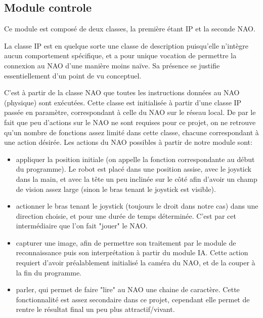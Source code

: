 \subsection{Module controle}
\label{sub:Module controle}
  \par Ce module est composé de deux classes, la première étant IP et la seconde NAO.

  \par La classe IP est en quelque sorte une classe de description puisqu'elle n'intègre aucun comportement spécifique, et a pour unique vocation de permettre la connexion au NAO d'une manière moins naïve.
  Sa présence se justifie essentiellement d'un point de vu conceptuel.

  \par C'est à partir de la classe NAO que toutes les instructions données au NAO (physique) sont exécutées.
  Cette classe est initialisée à partir d'une classe IP passée en paramètre, correspondant à celle du NAO sur le réseau local.
  De par le fait que peu d'actions sur le NAO ne sont requises pour ce projet, on ne retrouve qu'un nombre de fonctions assez limité dans cette classe, chacune correspondant à une action désirée.
  Les actions du NAO possibles à partir de notre module sont:
  \begin{itemize}
    \item appliquer la position initiale (on appelle la fonction correspondante au début du programme).
    Le robot est placé dans une position assise, avec le joystick dans la main, et avec la tête un peu inclinée sur le côté afin d'avoir un champ de vision assez large (sinon le bras tenant le joystick est visible).
    \item actionner le bras tenant le joystick (toujours le droit dans notre cas) dans une direction choisie, et pour une durée de temps déterminée.
    C'est par cet intermédiaire que l'on fait "jouer" le NAO.
    \item capturer une image, afin de permettre son traitement par le module de reconnaissance puis son interprétation à partir du module IA.
    Cette action requiert d'avoir préalablement initialisé la caméra du NAO, et de la couper à la fin du programme.
    \item parler, qui permet de faire "lire" au NAO une chaine de caractère.
    Cette fonctionnalité est assez secondaire dans ce projet, cependant elle permet de rentre le résultat final un peu plus attractif/vivant.
  \end{itemize}
\pagebreak
